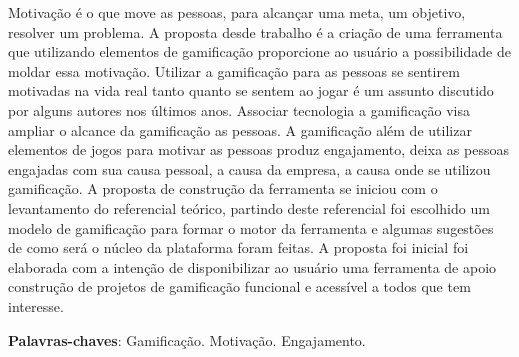\begin{resumo}


Motivação é o que move as pessoas, para alcançar uma meta, um objetivo, 
resolver um problema. A proposta desde trabalho é a criação de uma ferramenta
que utilizando elementos de gamificação proporcione ao usuário a possibilidade
de moldar essa motivação. Utilizar a gamificação para as pessoas se sentirem 
motivadas na vida real tanto quanto se sentem ao jogar é um assunto discutido
por alguns autores nos últimos anos. Associar tecnologia a gamificação visa
ampliar o alcance da gamificação as pessoas. A gamificação além de utilizar
elementos de jogos para motivar as pessoas produz engajamento, deixa as pessoas 
engajadas com sua causa pessoal, a causa da empresa, a causa onde se utilizou 
gamificação. A proposta de construção da ferramenta se iniciou com o levantamento
do referencial teórico, partindo deste referencial foi escolhido um modelo de 
gamificação para formar o motor da ferramenta e algumas sugestões de como será 
o núcleo da plataforma foram feitas. A proposta foi inicial foi elaborada 
com a intenção de disponibilizar ao usuário uma ferramenta de apoio construção 
de projetos de gamificação funcional e acessível a todos que tem interesse. 
 \vspace{\onelineskip}
    
 \noindent
 \textbf{Palavras-chaves}: Gamificação. Motivação. Engajamento.
\end{resumo}
